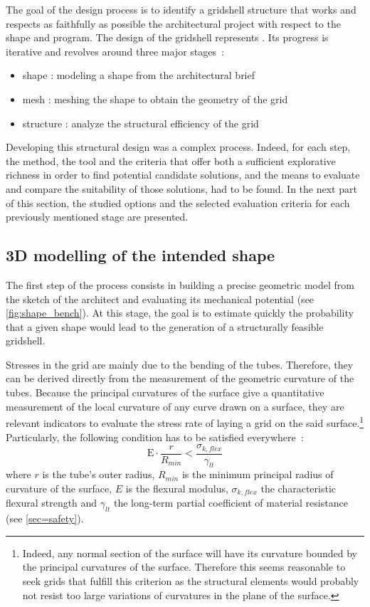 The goal of the design process is to identify a gridshell structure that works and respects as faithfully as possible the architectural project with respect to the shape and program. The design of the gridshell represents . Its progress is iterative and revolves around three major stages~: 
\begin{itemize}
\item shape : modeling a shape from the architectural brief
\item mesh : meshing the shape to obtain the geometry of the grid
\item structure : analyze the structural efficiency of the grid
\end{itemize}
Developing this structural design was a complex process. Indeed, for each step, the method, the tool and the criteria that offer both a sufficient explorative richness in order to find potential candidate solutions, and the means to evaluate and compare the suitability of those solutions, had to be found. In the next part of this section, the studied options and the selected evaluation criteria for each previously mentioned stage are presented.

\subsection{3D modelling of the intended shape}
The first step of the process consists in building a precise geometric model from the sketch of the architect and evaluating its mechanical potential (see \cref{fig:shape_bench}). At this stage, the goal is to estimate quickly the probability that a given shape would lead to the generation of a structurally feasible gridshell.

Stresses in the grid are mainly due to the bending of the tubes. Therefore, they can be derived directly from the measurement of the geometric curvature of the tubes. Because the principal curvatures of the surface give a quantitative measurement of the local curvature of any curve drawn on a surface, they are relevant indicators to evaluate the stress rate of laying a grid on the said surface.\footnote{Indeed, any normal section of the surface will have its curvature bounded by the principal curvatures of the surface. Therefore this seems reasonable to seek grids that fulfill this criterion as the structural elements would probably not resist too large variations of curvatures in the plane of the surface.} Particularly, the following condition has to be satisfied everywhere~: 
\begin{equation}
	\mathrm{E} \cdot \frac{r}{R_{min}} < \frac{\sigma_{k,flex}}{\gamma_{lt}} 
	\label{eq:crit_1}
\end{equation}
where $r$ is the tube’s outer radius, $R_{min}$ is the minimum principal radius of curvature of the surface, $E$ is the flexural modulus, $\sigma_{k,flex}$ the characteristic flexural strength and $\gamma_{lt}$ the long-term partial coefficient of material resistance (see \cref{sec=safety}). 

